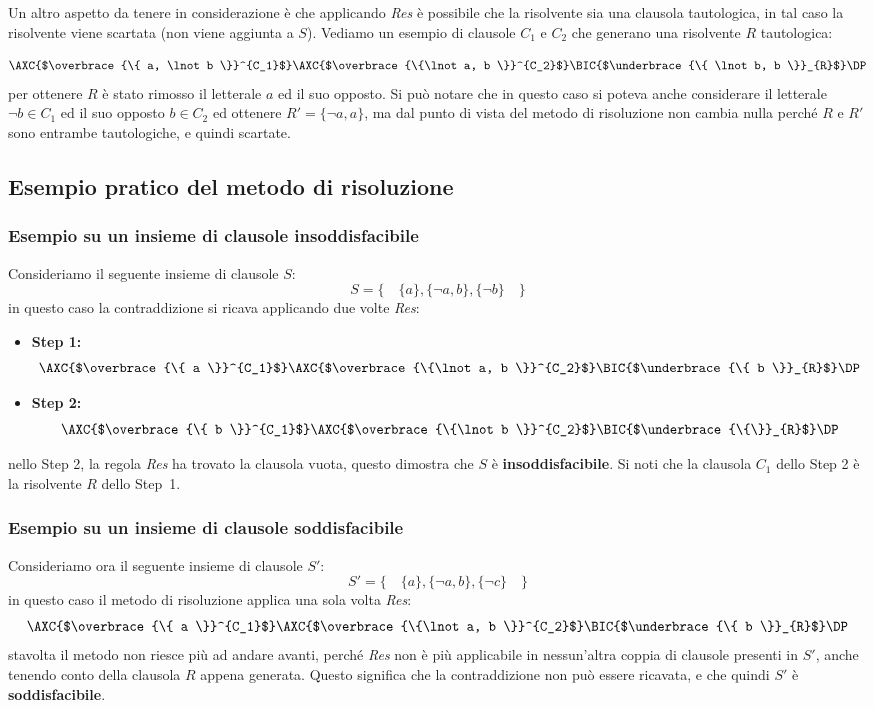 \documentclass[a4paper,12pt]{report}
\begin{document}
Un altro aspetto da tenere in considerazione è che applicando \emph{Res} è possibile che la risolvente sia una clausola tautologica, in tal caso la risolvente viene scartata (non viene aggiunta a $S$). Vediamo un esempio di clausole $C_1$ e $C_2$ che generano una risolvente $R$ tautologica:

\[
    \AXC{$\overbrace{\{ a, \lnot b \}}^{C_1}$}
    \AXC{$\overbrace{\{\lnot a, b \}}^{C_2}$}
    \RightLabel{Res}
    \BIC{$\underbrace{\{ \lnot b, b \}}_{R}$}
    \DP
\]
per ottenere $R$ è stato rimosso il letterale $a$ ed il suo opposto. Si può notare che in questo caso si poteva anche considerare il letterale $\lnot b \in C_1$ ed il suo opposto $b \in C_2$ ed ottenere $R' = \{ \lnot a, a \}$, ma dal punto di vista del metodo di risoluzione non cambia nulla perché $R$ e $R'$ sono entrambe tautologiche, e quindi scartate.

\subsection{Esempio pratico del metodo di risoluzione}
\subsubsection{Esempio su un insieme di clausole insoddisfacibile}
\label{resolution_example}
Consideriamo il seguente insieme di clausole $S$:
\[ S = \{ \quad \{a\}, \{\lnot a, b\}, \{\lnot b\} \quad \} \]
in questo caso la contraddizione si ricava applicando due volte \emph{Res}:

\begin{itemize}
    \item \textbf{Step 1:}
    \[
    \AXC{$\overbrace{\{ a \}}^{C_1}$}
    \AXC{$\overbrace{\{\lnot a, b \}}^{C_2}$}
    \RightLabel{Res}
    \BIC{$\underbrace{\{ b \}}_{R}$}
    \DP
    \]
    \item \textbf{Step 2:}
    \[
    \AXC{$\overbrace{\{ b \}}^{C_1}$}
    \AXC{$\overbrace{\{\lnot b \}}^{C_2}$}
    \RightLabel{Res}
    \BIC{$\underbrace{\{\}}_{R}$}
    \DP
    \]
\end{itemize}
nello Step 2, la regola \emph{Res} ha trovato la clausola vuota, questo dimostra che $S$ è \textbf{insoddisfacibile}. Si noti che la clausola $C_1$ dello Step 2 è la risolvente $R$ dello Step~1.

\subsubsection{Esempio su un insieme di clausole soddisfacibile}
Consideriamo ora il seguente insieme di clausole $S'$:
\[ S' = \{ \quad \{a\}, \{\lnot a, b\}, \{\lnot c\} \quad \} \]
in questo caso il metodo di risoluzione applica una sola volta \emph{Res}:
\[
    \AXC{$\overbrace{\{ a \}}^{C_1}$}
    \AXC{$\overbrace{\{\lnot a, b \}}^{C_2}$}
    \RightLabel{Res}
    \BIC{$\underbrace{\{ b \}}_{R}$}
    \DP
\]
stavolta il metodo non riesce più ad andare avanti, perché \emph{Res} non è più applicabile in nessun'altra coppia di clausole presenti in $S'$, anche tenendo conto della clausola $R$ appena generata. Questo significa che la contraddizione non può essere ricavata, e che quindi $S'$ è \textbf{soddisfacibile}.
\end{document}
